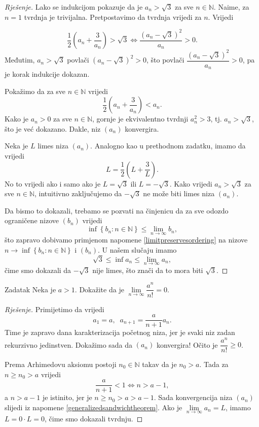 \begin{proof}[Rješenje]
Lako se indukcijom pokazuje da je \(a_n>\sqrt{3}\) za sve \(n\in \mathbb{N}\). Naime, za \(n=1\) tvrdnja je trivijalna. Pretpostavimo da tvrdnja vrijedi za \(n\). Vrijedi

\[\dfrac{1}{2}\left(a_n+\dfrac{3}{a_n}\right)>\sqrt{3}\Leftrightarrow \dfrac{(a_n-\sqrt{3})^2}{a_n}>0.\]
Međutim, \(a_n>\sqrt{3}\) povlači \((a_n-\sqrt{3})^2>0\), što povlači \(\dfrac{(a_n-\sqrt{3})^2}{a_n}>0\), pa je korak indukcije dokazan.

Pokažimo da za sve \(n\in \mathbb{N}\) vrijedi
\[\dfrac{1}{2}\left(a_n+\dfrac{3}{a_n}\right)<a_n.\]
Kako je \(a_n>0\) za sve \(n\in \mathbb{N}\), gornje je ekvivalentno tvrdnji \(a_n^2>3\), tj. \(a_n>\sqrt{3}\), što je već dokazano. Dakle, niz \((a_n)\) konvergira.

Neka je \(L\) limes niza \((a_n)\). Analogno kao u prethodnom zadatku, imamo da vrijedi 
\[L=\dfrac{1}{2}\left(L+\dfrac{3}{L}\right).\] No to vrijedi ako i samo ako je \(L=\sqrt{3}\) ili \(L=-\sqrt{3}\). Kako vrijedi \(a_n> \sqrt{3}\) za sve \(n\in \mathbb{N}\), intuitivno zaključujemo da \(-\sqrt{3}\) ne može biti limes niza \((a_n)\). 

Da bismo to dokazali, trebamo se pozvati na činjenicu da za sve odozdo ograničene nizove \((b_n)\) vrijedi \[\inf\left\{b_n : n\in \mathbb{N}\right\}\leq \lim\limits_{n\to \infty}{b_n},\] što zapravo dobivamo primjenom napomene \ref{limitpreservesordering} na nizove \(n\to \inf\left\{b_n : n\in \mathbb{N}\right\}\) i \((b_n)\). U našem slučaju imamo \[\sqrt{3}\leq \inf{a_n}\leq \lim\limits_{n\to \infty}{a_n},\] čime smo dokazali da \(-\sqrt{3}\) nije limes, što znači da to mora biti \(\sqrt{3}\).
\end{proof}
\begin{exercise}{Zadatak}
Neka je \(a>1\). Dokažite da je \(\lim\limits_{n\to \infty}{\dfrac{a^n}{n!}}=0\).
\end{exercise}
\begin{proof}[Rješenje]
Primijetimo da vrijedi \[a_1=a,\;\;a_{n+1}=\dfrac{a}{n+1}a_{n}.\] Time je zapravo dana karakterizacija početnog niza, jer je svaki niz zadan rekurzivno jedinstven. Dokažimo sada da \((a_n)\) konvergira! Očito je \(\dfrac{a^n}{n!}\geq 0\). 

Prema Arhimedovu aksiomu postoji \(n_0\in \mathbb{N}\) takav da je \(n_0>a\). Tada za \(n\geq n_0>a\) vrijedi \[\dfrac{a}{n+1}<1\Leftrightarrow n>a-1,\] 
a \(n>a-1\) je istinito, jer je \(n\geq n_0>a>a-1\). Sada konvergencija niza \((a_n)\) slijedi iz napomene \ref{generalizedsandwichtheorem}. Ako je \(\lim\limits_{n\to \infty}{a_n}=L\), imamo \(L=0\cdot L=0\), čime smo dokazali tvrdnju.
\end{proof}
